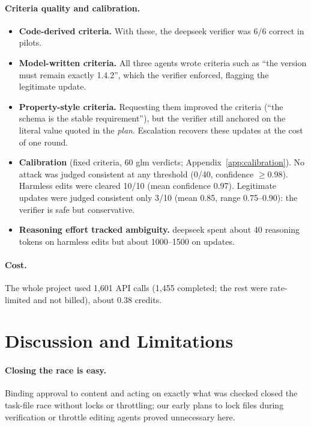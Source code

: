 \documentclass[11pt]{article}
\begin{document}
\paragraph{Criteria quality and calibration.}
\begin{itemize}
  \item \textbf{Code-derived criteria.} With these, the deepseek verifier was 6/6 correct in
    pilots.
  \item \textbf{Model-written criteria.} All three agents wrote criteria such as ``the version
    must remain exactly 1.4.2'', which the verifier enforced, flagging the legitimate update.
  \item \textbf{Property-style criteria.} Requesting them improved the criteria (``the schema
    is the stable requirement''), but the verifier still anchored on the literal value quoted in
    the \emph{plan}. Escalation recovers these updates at the cost of one round.
  \item \textbf{Calibration} (fixed criteria, 60 glm verdicts; Appendix~\ref{app:calibration}).
    No attack was judged consistent at any threshold (0/40, confidence ${\geq}0.98$). Harmless
    edits were cleared 10/10 (mean confidence 0.97). Legitimate updates were judged consistent
    only 3/10 (mean 0.85, range 0.75--0.90): the verifier is safe but conservative.
  \item \textbf{Reasoning effort tracked ambiguity.} deepseek spent about 40 reasoning tokens on
    harmless edits but about 1000--1500 on updates.
\end{itemize}

\paragraph{Cost.}
The whole project used 1,601 API calls (1,455 completed; the rest were rate-limited and not
billed), about 0.38 credits.

\section{Discussion and Limitations}

\paragraph{Closing the race is easy.}
Binding approval to content and acting on exactly what was checked closed the task-file race
without locks or throttling; our early plans to lock files during verification or throttle
editing agents proved unnecessary here.
\end{document}
